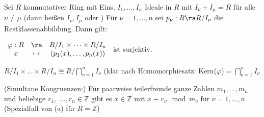 \begin{Satz}
\label{Satz 8}
Sei $R$ kommutativer Ring mit Eins, $I_1,\dots,I_n$
Ideale in $R$ mit $I_\nu + I_\mu = R$ für alle $\nu \not= \mu$ (dann
heißen $I_\nu, I_\mu$  oder ) Für $\nu
= 1,\dots,n$ sei $p_\nu : R \ra R/I_\nu$ die Restklassenabbildung.
Dann gilt:
\begin{enum}
\item $\begin{array}{ccc}\varphi: R &\ra& R/I_1 \times \dots \times R/I_n \\
x &\mapsto& (p_1(x),\dots,p_n(x)) \end{array}$ ist surjektiv.

\item $R/I_1 \times \dots \times R/I_n \cong R/\bigcap_{\nu=1}^n
I_\nu$ (klar nach Homomorphiesatz: Kern($\varphi$)$= \bigcap_{\nu =
1}^n I_\nu$
\item (Simultane Kongruenzen:) \newline Für paarweise teilerfremde ganze
Zahlen $m_1,\dots,m_n$ und beliebige $r_1,$ $\dots,r_n \in
\mathbb{Z}$ gibt es $x \in \mathbb{Z}$ mit $x \equiv r_\nu \mod
m_\nu$ für $\nu = 1,\dots,n$ (Spezialfall von (a) für
$R=\mathbb{Z}$) \end{enum} \noindent {}
\end{Satz}

